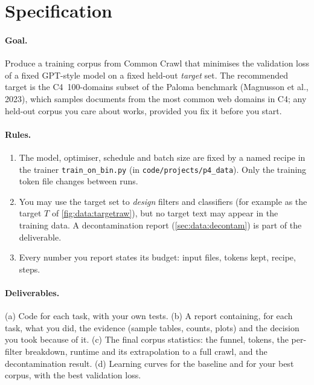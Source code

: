 \section{Specification}\label{sec:proj4:overview}

\paragraph{Goal.} Produce a training corpus from Common Crawl that minimises the validation loss
of a fixed GPT-style model on a fixed held-out \emph{target} set. The recommended target is the
C4~100-domains subset of the Paloma benchmark (Magnusson et al., 2023), which samples documents from
the most common web domains in C4; any held-out corpus you care about works, provided you fix it
before you start.

\paragraph{Rules.}
\begin{enumerate}
  \item The model, optimiser, schedule and batch size are fixed by a named recipe in the
        trainer \texttt{train\_on\_bin.py} (in \texttt{code/projects/p4\_data}). Only the training token
        file changes between runs.
  \item You may use the target set to \emph{design} filters and classifiers (for example as the
        target $T$ of \cref{fig:data:targetraw}), but no target text may appear in the training data.
        A decontamination report (\cref{sec:data:decontam}) is part of the deliverable.
  \item Every number you report states its budget: input files, tokens kept, recipe, steps.
\end{enumerate}

\paragraph{Deliverables.} (a) Code for each task, with your own tests. (b) A report containing, for each
task, what you did, the evidence (sample tables, counts, plots) and the decision you took because of it.
(c) The final corpus statistics: the funnel, tokens, the per-filter breakdown, runtime and its extrapolation to a full
crawl, and the decontamination result. (d) Learning curves for the baseline and for your best corpus, with the
best validation loss.

